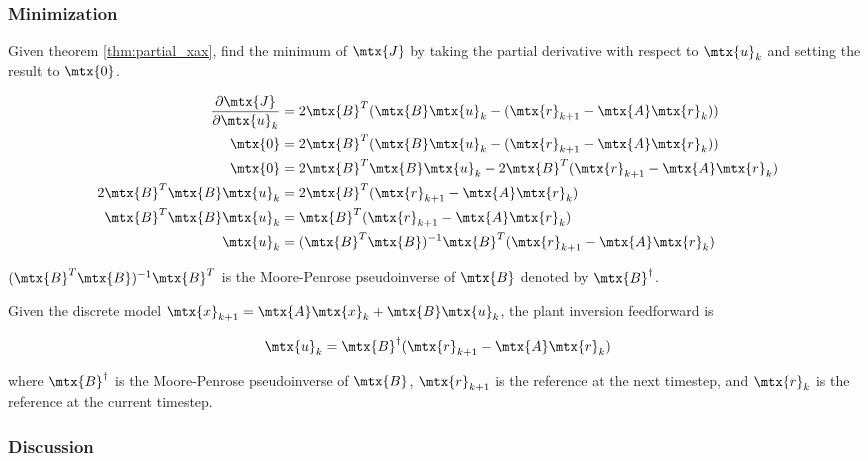 \subsubsection{Minimization}

Given theorem \ref{thm:partial_xax}, find the minimum of $\mtx{J}$ by taking the
partial derivative with respect to $\mtx{u}_k$ and setting the result to
$\mtx{0}$.

\begin{align*}
  \frac{\partial\mtx{J}}{\partial\mtx{u}_k} &= 2\mtx{B}^T
    (\mtx{B}\mtx{u}_k - (\mtx{r}_{k+1} - \mtx{A}\mtx{r}_k)) \\
  \mtx{0} &= 2\mtx{B}^T
    (\mtx{B}\mtx{u}_k - (\mtx{r}_{k+1} - \mtx{A}\mtx{r}_k)) \\
  \mtx{0} &= 2\mtx{B}^T\mtx{B}\mtx{u}_k -
    2\mtx{B}^T(\mtx{r}_{k+1} - \mtx{A}\mtx{r}_k) \\
  2\mtx{B}^T\mtx{B}\mtx{u}_k &=
    2\mtx{B}^T(\mtx{r}_{k+1} - \mtx{A}\mtx{r}_k) \\
  \mtx{B}^T\mtx{B}\mtx{u}_k &=
    \mtx{B}^T(\mtx{r}_{k+1} - \mtx{A}\mtx{r}_k) \\
  \mtx{u}_k &=
    (\mtx{B}^T\mtx{B})^{-1} \mtx{B}^T(\mtx{r}_{k+1} - \mtx{A}\mtx{r}_k)
\end{align*}

$(\mtx{B}^T\mtx{B})^{-1} \mtx{B}^T$ is the Moore-Penrose pseudoinverse of
$\mtx{B}$ denoted by $\mtx{B}^\dagger$.

\begin{theorem}
  \label{thm:linear_plant_inversion}

  Given the discrete model
  $\mtx{x}_{k+1} = \mtx{A}\mtx{x}_k + \mtx{B}\mtx{u}_k$, the plant inversion
  feedforward is

  \begin{equation}
    \mtx{u}_k = \mtx{B}^\dagger (\mtx{r}_{k+1} - \mtx{A}\mtx{r}_k)
  \end{equation}

  where $\mtx{B}^\dagger$ is the Moore-Penrose pseudoinverse of $\mtx{B}$,
  $\mtx{r}_{k+1}$ is the reference at the next timestep, and $\mtx{r}_k$ is the
  reference at the current timestep.
\end{theorem}

\subsubsection{Discussion}

